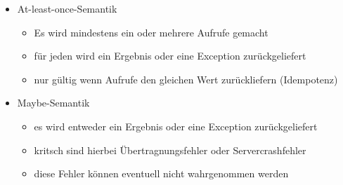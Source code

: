 \documentclass[ngerman]{fbi-aufgabenblatt}
\begin{document}
  \begin{itemize}
    \item At-least-once-Semantik
      \begin{itemize}
        \item Es wird mindestens ein oder mehrere Aufrufe gemacht
        \item für jeden wird ein Ergebnis oder eine Exception zurückgeliefert
        \item nur gültig wenn Aufrufe den gleichen Wert zurückliefern (Idempotenz)
      \end{itemize}
  \end{itemize}

  \begin{itemize}
    \item Maybe-Semantik 
      \begin{itemize}
        \item es wird entweder ein Ergebnis oder eine Exception zurückgeliefert
        \item kritsch sind hierbei Übertragnungsfehler oder Servercrashfehler
        \item diese Fehler können eventuell nicht wahrgenommen werden 
      \end{itemize}
  \end{itemize}
\end{document}
